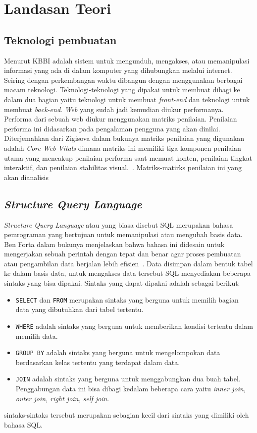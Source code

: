 \chapter{Landasan Teori}
\label{chap:teori}

\section{Teknologi pembuatan \web}
\label{sec:web} 
 
Menurut KBBI \web adalah sistem untuk mengunduh, mengakses, atau memanipulasi informasi yang ada di dalam komputer yang dihubungkan melalui internet. Seiring dengan perkembangan waktu \web dibangun dengan menggunakan berbagai macam teknologi.
Teknologi-teknologi yang dipakai untuk membuat \web dibagi ke dalam dua bagian yaitu teknologi untuk membuat \textit{front-end} dan teknologi untuk membuat \textit{back-end}. \textit{Web} yang sudah jadi kemudian diukur performanya. Performa dari sebuah web diukur menggunakan matriks penilaian. Penilaian performa ini didasarkan pada pengalaman pengguna \web yang akan dinilai. Diterjemahkan dari Zigisova dalam bukunya matriks penilaian yang digunakan adalah \textit{Core Web Vitals} dimana matriks ini memiliki tiga komponen penilaian utama yang mencakup penilaian performa saat memuat konten, penilaian tingkat interaktif, dan penilaian stabilitas visual.~\cite{WebAlmanac.2024.Performance}. Matriks-matirks penilaian ini yang akan dianalisis

\section{\textit{Structure Query Language}}
\label{sec:sql}
\textit{Structure Query Language} atau yang biasa disebut SQL merupakan bahasa pemrograman yang bertujuan untuk memanipulasi atau mengubah basis data. Ben Forta dalam bukunya menjelaskan bahwa bahasa ini didesain untuk mengerjakan sebuah perintah dengan tepat dan benar agar proses pembuatan atau pengambilan data berjalan lebih efisien~\cite{ben}. Data disimpan dalam bentuk tabel ke dalam basis data, untuk mengakses data tersebut SQL menyediakan beberapa sintaks yang bisa dipakai. Sintaks yang dapat dipakai adalah sebagai berikut:
\begin{itemize}
    \item \verb|SELECT| dan \verb|FROM| merupakan sintaks yang berguna untuk memilih bagian data yang dibutuhkan dari tabel tertentu.
    \item \verb|WHERE| adalah sintaks yang berguna untuk memberikan kondisi tertentu dalam memilih data.
    \item \verb|GROUP BY| adalah sintaks yang berguna untuk mengelompokan data berdasarkan kelas tertentu yang terdapat dalam data.
    \item \verb|JOIN| adalah sintaks yang berguna untuk menggabungkan dua buah tabel. Penggabungan data ini bisa dibagi kedalam beberapa cara yaitu \textit{inner join, outer join, right join, self join}.
\end{itemize}
sintaks-sintaks tersebut merupakan sebagian kecil dari sintaks yang dimiliki oleh bahasa SQL.

